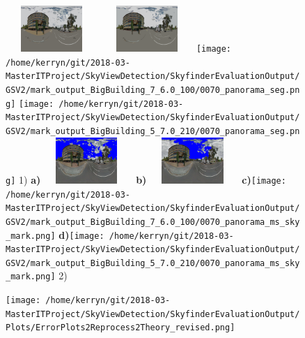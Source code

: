 \documentclass{article}
\begin{document}
\begin{figure}
\centering  
\textbf{}\includegraphics[width=3.50cm,height=1.75cm]{Images/mean/4880_7_6_100.png} 
\textbf{}\includegraphics[width=3.50cm,height=1.75cm]{Images/mean/4880_5_7_210.png} 
\textbf{}\texttt{[image: /home/kerryn/git/2018-03-MasterITProject/SkyViewDetection/SkyfinderEvaluationOutput/GSV2/mark\_output\_BigBuilding\_7\_6.0\_100/0070\_panorama\_seg.png]} 
\textbf{}\texttt{[image: /home/kerryn/git/2018-03-MasterITProject/SkyViewDetection/SkyfinderEvaluationOutput/GSV2/mark\_output\_BigBuilding\_5\_7.0\_210/0070\_panorama\_seg.png]} 
\scriptsize{1)}
\textbf{\textbf{\scriptsize{a)}}}\includegraphics[width=3.50cm,height=1.75cm]{Images/mean/4880_7_6_100_ms_sky_mark.png} 
\textbf{\textbf{\scriptsize{b)}}}\includegraphics[width=3.50cm,height=1.75cm]{Images/mean/4880_5_7_210_ms_sky_mark.png} 
\textbf{\scriptsize{c)}}\texttt{[image: /home/kerryn/git/2018-03-MasterITProject/SkyViewDetection/SkyfinderEvaluationOutput/GSV2/mark\_output\_BigBuilding\_7\_6.0\_100/0070\_panorama\_ms\_sky\_mark.png]} 
\textbf{\scriptsize{d)}}\texttt{[image: /home/kerryn/git/2018-03-MasterITProject/SkyViewDetection/SkyfinderEvaluationOutput/GSV2/mark\_output\_BigBuilding\_5\_7.0\_210/0070\_panorama\_ms\_sky\_mark.png]} 
\scriptsize{2)}

\end{figure} 

\clearpage %


\begin{figure}
\centering  
\texttt{[image: /home/kerryn/git/2018-03-MasterITProject/SkyViewDetection/SkyfinderEvaluationOutput/Plots/ErrorPlots2Reprocess2Theory\_revised.png]}
\end{figure} 
\end{document}
